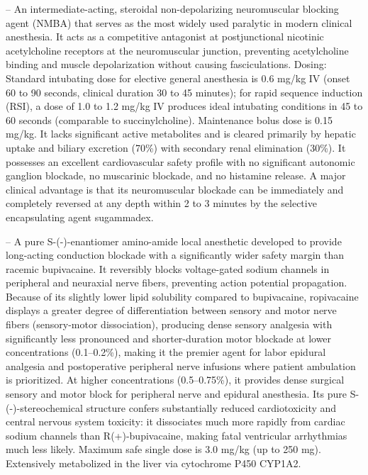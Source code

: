 -- An intermediate-acting, steroidal non-depolarizing neuromuscular blocking agent (NMBA) that serves as the most widely used paralytic in modern clinical anesthesia. It acts as a competitive antagonist at postjunctional nicotinic acetylcholine receptors at the neuromuscular junction, preventing acetylcholine binding and muscle depolarization without causing fasciculations. Dosing: Standard intubating dose for elective general anesthesia is 0.6 mg/kg IV (onset 60 to 90 seconds, clinical duration 30 to 45 minutes); for rapid sequence induction (RSI), a dose of 1.0 to 1.2 mg/kg IV produces ideal intubating conditions in 45 to 60 seconds (comparable to succinylcholine). Maintenance bolus dose is 0.15 mg/kg. It lacks significant active metabolites and is cleared primarily by hepatic uptake and biliary excretion (70\%) with secondary renal elimination (30\%). It possesses an excellent cardiovascular safety profile with no significant autonomic ganglion blockade, no muscarinic blockade, and no histamine release. A major clinical advantage is that its neuromuscular blockade can be immediately and completely reversed at any depth within 2 to 3 minutes by the selective encapsulating agent sugammadex.

-- A pure S-(-)-enantiomer amino-amide local anesthetic developed to provide long-acting conduction blockade with a significantly wider safety margin than racemic bupivacaine. It reversibly blocks voltage-gated sodium channels in peripheral and neuraxial nerve fibers, preventing action potential propagation. Because of its slightly lower lipid solubility compared to bupivacaine, ropivacaine displays a greater degree of differentiation between sensory and motor nerve fibers (sensory-motor dissociation), producing dense sensory analgesia with significantly less pronounced and shorter-duration motor blockade at lower concentrations (0.1--0.2\%), making it the premier agent for labor epidural analgesia and postoperative peripheral nerve infusions where patient ambulation is prioritized. At higher concentrations (0.5--0.75\%), it provides dense surgical sensory and motor block for peripheral nerve and epidural anesthesia. Its pure S-(-)-stereochemical structure confers substantially reduced cardiotoxicity and central nervous system toxicity: it dissociates much more rapidly from cardiac sodium channels than R(+)-bupivacaine, making fatal ventricular arrhythmias much less likely. Maximum safe single dose is 3.0 mg/kg (up to 250 mg). Extensively metabolized in the liver via cytochrome P450 CYP1A2.

